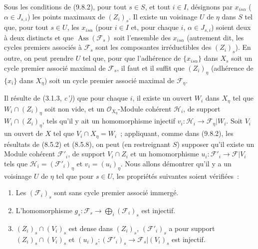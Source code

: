 \begin{proposition}[9.8.3]
\label{IV.9.8.3-fr}
Sous les conditions de (9.8.2), pour tout $s\in S$, et tout $i\in I$, désignons
par $x_{is\alpha}$ ($\alpha\in J_{s,i}$) les points maximaux de $(Z_i)_s$. Il
existe un voisinage $U$ de $\eta$ dans $S$ tel que, pour tout $s\in U$, les
$x_{is\alpha}$ (pour $i\in I$ et, pour chaque $i$, $\alpha\in J_{s,i}$) soient
deux à deux distincts et que $\operatorname{Ass}(\mathcal F_s)$ soit l'ensemble
des $x_{is\alpha}$ (autrement dit, les cycles premiers associés à $\mathcal F_s$
sont les composantes irréductibles des $(Z_i)_s$). En outre, on peut prendre
$U$ tel que, pour que l'adhérence de $\{x_{is\alpha}\}$ dans $X_s$ soit un cycle
premier associé maximal de $\mathcal F_s$, il faut et il suffit que $(Z_i)_\eta$
(adhérence de $\{x_i\}$ dans $X_\eta$) soit un cycle premier associé maximal de
$\mathcal F_\eta$.
\end{proposition}

Il résulte de (3.1.3, \emph{c')}) que pour chaque $i$, il existe un ouvert $W_i$
dans $X_\eta$ tel que $W_i\cap(Z_i)_\eta$ soit non vide, et un
$\mathcal O_{X_\eta}$-Module cohérent $\mathcal H_i$, de support
$W_i\cap(Z_i)_\eta$, tels qu'il y ait un homomorphisme injectif
$v_i:\mathcal H_i\to\mathcal F_\eta|W_i$. Soit $V_i$ un ouvert de $X$ tel que
$V_i\cap X_\eta=W_i$~; appliquant, comme dans (9.8.2), les résultats de (8.5.2)
et (8.5.8), on peut (en restreignant $S$) supposer qu'il existe un Module
cohérent $\mathcal F'_i$, de support $V_i\cap Z_i$ et un homomorphisme
$u_i:\mathcal F'_i\to\mathcal F|V_i$ tels que
$\mathcal H_i=(\mathcal F'_i)_\eta$ et $v_i=(u_i)_\eta$. Nous allons démontrer
qu'il y a un voisinage $U$ de $\eta$ tel que pour $s\in U$, les propriétés
suivantes soient vérifiées~:
\begin{enumerate}[label=\emph{(\roman*)}]
  \item Les $(\mathcal F_i)_s$ sont sans cycle premier associé immergé.
  \item L'homomorphisme
  $g_s:\mathcal F_s\to\bigoplus_i(\mathcal F_i)_s$ est injectif.
  \item $(Z_i)_s\cap(V_i)_s$ est dense dans $(Z_i)_s$,
  $(\mathcal F'_i)_s$ a pour support $(Z_i)_s\cap(V_i)_s$ et
  $(u_i)_s:(\mathcal F'_i)_s\to\mathcal F_s|(V_i)_s$ est injectif.
\end{enumerate}


